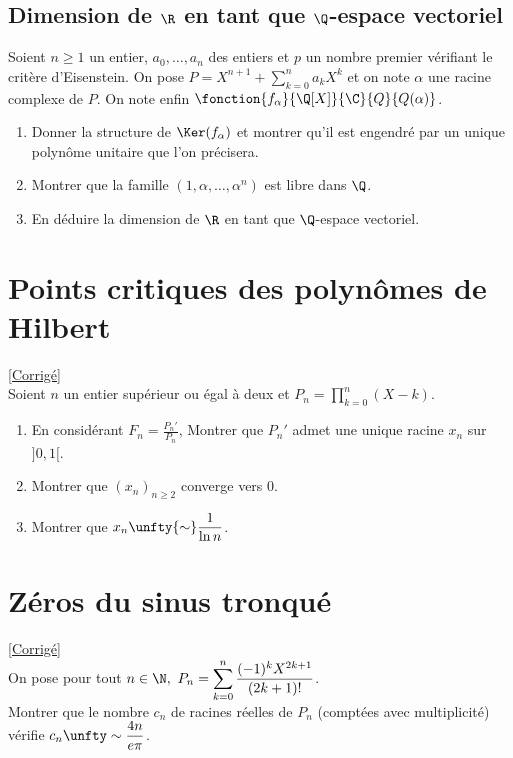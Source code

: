 \documentclass{book}
\begin{document}
	\subsection{Dimension de $\R$ en tant que $\Q$-espace vectoriel }
	Soient $n\geq 1$ un entier, $a_0,\dots,a_n$ des entiers et $p$ un nombre premier vérifiant le critère d'Eisenstein. On pose $P=X^{n+1}+\displaystyle\sum_{k=0}^na_kX^k$ et on note $\alpha$ une racine complexe de $P$. On note enfin $\fonction{f_\alpha}{\Q[X]}{\C}{Q}{Q(\alpha)}$.
	\begin{enumerate}
		\item Donner la structure de $\Ker(f_\alpha)$ et montrer qu'il est engendré par un unique polynôme unitaire que l'on précisera.
		\item Montrer que la famille $(1,\alpha,\dots,\alpha^n)$ est libre dans $\Q$.
		\item En déduire la dimension de $\R$ en tant que $\Q$-espace vectoriel.
	\end{enumerate}
	
	\section{Points critiques des polynômes de Hilbert }
	\textcolor{blue}{\hyperref[sec:points-critiques-des-polynômes-de-hilbert]{[Corrigé]}}\\
	\label{Points critiques des polynômes de Hilbert}
	Soient $n$ un entier supérieur ou égal à deux et $P_n=\displaystyle\prod\limits_{k=0}^n(X-k)$.
	\begin{enumerate}
		\item En considérant $F_n=\displaystyle\frac{P_n'}{P_n}$, Montrer que $P_n'$ admet une unique racine $x_n$ sur $]0,1[$.
		\item Montrer que $(x_n)_{n\geq 2}$ converge vers $0$.
		\item Montrer que $x_n\unfty{\sim}\displaystyle\frac{1}{\ln n}$.
	\end{enumerate}
	
	\section{Zéros du sinus tronqué}
	\textcolor{blue}{\hyperref[sec:zeros-du-sinus-tronqué]{[Corrigé]}}\\
	\label{Zéros du sinus tronqué}
	On pose pour tout $n\in \N,\ P_n=\displaystyle\sum_{k=0}^n\frac{(-1)^kX^{2k+1}}{(2k+1)!}$.\\
	Montrer que le nombre $c_n$ de racines réelles de $P_n$ (comptées avec multiplicité) vérifie $c_n\unfty\sim\displaystyle\frac{4n}{e\pi}$.
	
\end{document}
